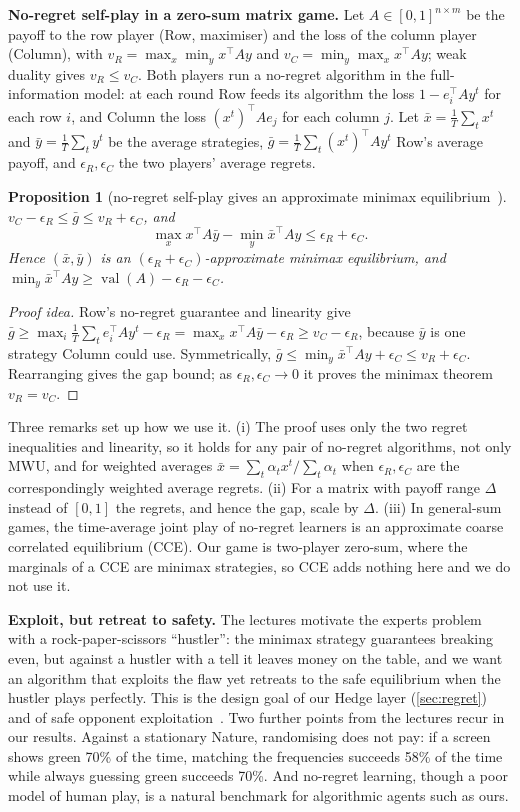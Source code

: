\documentclass[10pt]{article}
\theoremstyle{plain}
\newtheorem{proposition}[theorem]{Proposition}
\theoremstyle{definition}
\theoremstyle{remark}
\DeclareMathOperator{\val}{val}
\begin{document}
\textbf{No-regret self-play in a zero-sum matrix game.} Let $A\in[0,1]^{n\times m}$ be the payoff to the row player (Row, maximiser) and the loss of the column player (Column), with $v_R=\max_x\min_yx^\top Ay$ and $v_C=\min_y\max_xx^\top Ay$; weak duality gives $v_R\le v_C$. Both players run a no-regret algorithm in the full-information model: at each round Row feeds its algorithm the loss $1-e_i^\top Ay^t$ for each row $i$, and Column the loss $(x^t)^\top Ae_j$ for each column $j$. Let $\bar x=\frac1T\sum_tx^t$ and $\bar y=\frac1T\sum_ty^t$ be the average strategies, $\bar g=\frac1T\sum_t(x^t)^\top Ay^t$ Row's average payoff, and $\epsilon_R,\epsilon_C$ the two players' average regrets.
\begin{proposition}[no-regret self-play gives an approximate minimax equilibrium~\cite{FS97,CS535L6}]\label{prop:selfplay}
$v_C-\epsilon_R\le\bar g\le v_R+\epsilon_C$, and
\[
\max_xx^\top A\bar y-\min_y\bar x^\top Ay\le\epsilon_R+\epsilon_C .
\]
Hence $(\bar x,\bar y)$ is an $(\epsilon_R+\epsilon_C)$-approximate minimax equilibrium, and $\min_y\bar x^\top Ay\ge\val(A)-\epsilon_R-\epsilon_C$.
\end{proposition}
\begin{proof}[Proof idea]
Row's no-regret guarantee and linearity give $\bar g\ge\max_i\frac1T\sum_te_i^\top Ay^t-\epsilon_R=\max_xx^\top A\bar y-\epsilon_R\ge v_C-\epsilon_R$, because $\bar y$ is one strategy Column could use. Symmetrically, $\bar g\le\min_y\bar x^\top Ay+\epsilon_C\le v_R+\epsilon_C$. Rearranging gives the gap bound; as $\epsilon_R,\epsilon_C\to0$ it proves the minimax theorem $v_R=v_C$.
\end{proof}
Three remarks set up how we use it. (i) The proof uses only the two regret inequalities and linearity, so it holds for any pair of no-regret algorithms, not only MWU, and for weighted averages $\bar x=\sum_t\alpha_tx^t/\sum_t\alpha_t$ when $\epsilon_R,\epsilon_C$ are the correspondingly weighted average regrets. (ii) For a matrix with payoff range $\Delta$ instead of $[0,1]$ the regrets, and hence the gap, scale by $\Delta$. (iii) In general-sum games, the time-average joint play of no-regret learners is an approximate coarse correlated equilibrium (CCE). Our game is two-player zero-sum, where the marginals of a CCE are minimax strategies, so CCE adds nothing here and we do not use it.

\textbf{Exploit, but retreat to safety.} The lectures motivate the experts problem with a rock-paper-scissors ``hustler'': the minimax strategy guarantees breaking even, but against a hustler with a tell it leaves money on the table, and we want an algorithm that exploits the flaw yet retreats to the safe equilibrium when the hustler plays perfectly. This is the design goal of our Hedge layer (\cref{sec:regret}) and of safe opponent exploitation~\cite{Gan15}. Two further points from the lectures recur in our results. Against a stationary Nature, randomising does not pay: if a screen shows green 70\% of the time, matching the frequencies succeeds 58\% of the time while always guessing green succeeds 70\%. And no-regret learning, though a poor model of human play, is a natural benchmark for algorithmic agents such as ours.
\end{document}
